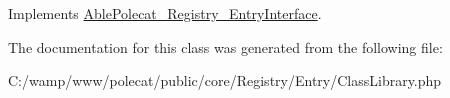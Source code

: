 Implements \hyperlink{interface_able_polecat___registry___entry_interface_a999eef977eb899167ae02f83dd26a4ae}{Able\+Polecat\+\_\+\+Registry\+\_\+\+Entry\+Interface}.



The documentation for this class was generated from the following file\+:\begin{DoxyCompactItemize}
\item 
C\+:/wamp/www/polecat/public/core/\+Registry/\+Entry/Class\+Library.\+php\end{DoxyCompactItemize}
